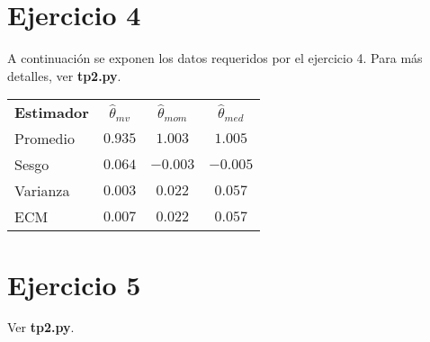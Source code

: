 \section{Ejercicio 4}
A continuación se exponen los datos requeridos por el ejercicio 4. Para más detalles, ver \textbf{tp2.py}.
\begin{table}[H]
	\centering
	\begin{tabular}{lccc}
		\textbf{Estimador} & $\hat{\theta}_{mv}$ & $\hat{\theta}_{mom}$ & $\hat{\theta}_{med}$ \\
		Promedio  & $0.935$ 				& $1.003$ 				& $1.005$ \\
		Sesgo     & $0.064$ 				& $-0.003$ 				& $-0.005$ \\
		Varianza  & $0.003$ 				& $0.022$ 				& $0.057$ \\
		ECM       & $0.007$ 				& $0.022$ 				& $0.057$
	\end{tabular}
\end{table}

\section{Ejercicio 5}
Ver \textbf{tp2.py}.